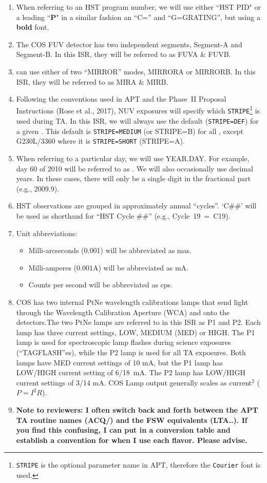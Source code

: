 \begin{enumerate}
	\item{When referring to an HST program number, we will use either ``HST PID" or a leading ``{\bf P}" in a similar fashion an ``C=\cenwave'' and ``G=GRATING'', but using a {\bf bold} font.}
	\item{The COS FUV detector has two independent segments, Segment-A and Segment-B. In this ISR, they will be referred to as FUVA \& FUVB.}
	\item{ can use either of two ``MIRROR'' modes, MIRRORA or MIRRORB. In this ISR, they will be referred to as MIRA \& MIRB.}
	\item{Following the conventions used in APT and the Phase~II Proposal Instructions (Rose et al., 2017), NUV  exposures will specify which \texttt{STRIPE}\footnote{\texttt{STRIPE} is the optional parameter name in APT, therefore the \texttt{Courier} font is used.} is used during TA. In this ISR, we will always use
	the default (\texttt{STRIPE=DEF}) for a given \cenwave. This default is \texttt{STRIPE=MEDIUM} (or STRIPE=B) for all \cenwaves, except G230L/3360 where it is \texttt{STRIPE=SHORT} (STRIPE=A).}
	\item{When referring to a particular day, we will use YEAR.DAY. For example, day 60 of 2010 will be referred to as \psiafdate. We will also occasionally use decimal years. In these cases, there will only be a single digit in the fractional part (e.g., 2009.9).}
	\item{HST observations are grouped in approximately annual ``cycles''. `C\#\#' will be used as shorthand for ``HST Cycle \#\#'' (e.g., Cycle~19~=~C19).}
	\item{Unit abbreviations:
		\begin{itemize}
		\item{Milli-arcseconds (0.001\arcsec) will be abbreviated as mas.}
		\item{Milli-amperes (0.001A) will be abbreviated as mA.}
		\item{Counts per second will be abbreviated as cps.}
		\end{itemize}
	}
	\item{COS has two internal PtNe wavelength calibrations lamps that send light through the Wavelength Calibration Aperture (WCA) and onto the detectors.The two PtNe lamps are referred to in this ISR
	as P1 and P2. Each lamp has three current settings, LOW, MEDIUM (MED) or HIGH. The P1 lamp is used for spectroscopic lamp flashes during science exposures (``TAGFLASH''es), while the P2 lamp is used for all TA exposures.
	Both lamps have MED current settings of 10 mA, but the P1 lamp has LOW/HIGH current setting of 6/18~mA. The P2 lamp
	has LOW/HIGH current settings of 3/14 mA. COS Lamp output generally scales as current$^{2}$ ($P=I^2 R$).}
	\item{{\bf Note to reviewers: I often switch back and forth between the APT TA routine names (ACQ/) and the FSW equivalents (LTA..). If you find this confusing, I can put in a conversion table and establish a convention for
	when I use each flavor. Please advise.}}
\end{enumerate}

